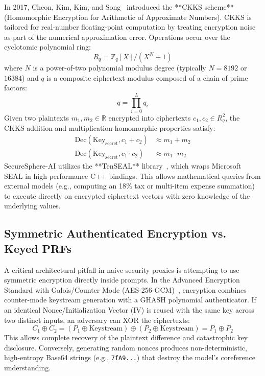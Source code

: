 In 2017, Cheon, Kim, Kim, and Song~\cite{cheon2017homomorphic} introduced the **CKKS scheme** (Homomorphic Encryption for Arithmetic of Approximate Numbers). CKKS is tailored for real-number floating-point computation by treating encryption noise as part of the numerical approximation error. Operations occur over the cyclotomic polynomial ring:
\begin{equation}
R_q = \mathbb{Z}_q[X] / (X^N + 1)
\end{equation}
where $N$ is a power-of-two polynomial modulus degree (typically $N=8192$ or $16384$) and $q$ is a composite ciphertext modulus composed of a chain of prime factors:
\begin{equation}
q = \prod_{i=0}^L q_i
\end{equation}
Given two plaintexts $m_1, m_2 \in \mathbb{R}$ encrypted into ciphertexts $c_1, c_2 \in R_q^2$, the CKKS addition and multiplication homomorphic properties satisfy:
\begin{align}
\text{Dec}(\text{Key}_{\text{secret}}, c_1 + c_2) &\approx m_1 + m_2 \\
\text{Dec}(\text{Key}_{\text{secret}}, c_1 \cdot c_2) &\approx m_1 \cdot m_2
\end{align}
SecureSphere-AI utilizes the **TenSEAL** library~\cite{tenseal2021}, which wraps Microsoft SEAL in high-performance C++ bindings. This allows mathematical queries from external models (e.g., computing an 18\% tax or multi-item expense summation) to execute directly on encrypted ciphertext vectors with zero knowledge of the underlying values.

\subsection{Symmetric Authenticated Encryption vs. Keyed PRFs}
A critical architectural pitfall in naive security proxies is attempting to use symmetric encryption directly inside prompts. In the Advanced Encryption Standard with Galois/Counter Mode (AES-256-GCM)~\cite{dworkin2007sp800}, encryption combines counter-mode keystream generation with a GHASH polynomial authenticator. If an identical Nonce/Initialization Vector (IV) is reused with the same key across two distinct inputs, an adversary can XOR the ciphertexts:
\begin{equation}
C_1 \oplus C_2 = (P_1 \oplus \text{Keystream}) \oplus (P_2 \oplus \text{Keystream}) = P_1 \oplus P_2
\end{equation}
This allows complete recovery of the plaintext difference and catastrophic key disclosure. Conversely, generating random nonces produces non-deterministic, high-entropy Base64 strings (e.g., \texttt{7fA9...}) that destroy the model's coreference understanding.

